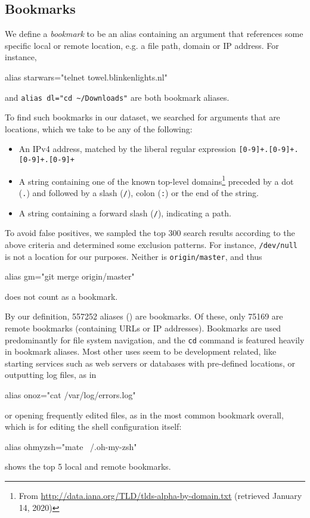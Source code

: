 \subsection{Bookmarks}

We define a \emph{bookmark} to be an alias containing an argument that references some specific local or remote location, e.g. a file path, domain or IP address.
For instance, 
\begin{CVerbatim}
alias starwars="telnet towel.blinkenlights.nl"    
\end{CVerbatim}
and \verb|alias dl="cd ~/Downloads"|
are both bookmark aliases.

To find such bookmarks in our dataset, we searched for arguments that are locations, which we take to be any of the following:
\begin{itemize}
    \item An IPv4 address, matched by the liberal regular expression \verb|[0-9]+.[0-9]+.[0-9]+.[0-9]+|
    \item A string containing one of the known top-level domains\footnote{From \url{http://data.iana.org/TLD/tlds-alpha-by-domain.txt} (retrieved January 14, 2020)} preceded by a dot (\verb|.|) and followed by a slash (\verb|/|), colon (\verb|:|) or the end of the string.
    \item A string containing a forward slash (\verb|/|), indicating a path.
\end{itemize}
To avoid false positives, we sampled the top 300 search results according to the above criteria and determined some exclusion patterns.
For instance, \texttt{/dev/null} is not a location for our purposes.
Neither is \texttt{origin/master}, and thus 
\begin{CVerbatim}
alias gm="git merge origin/master"
\end{CVerbatim}
does not count as a bookmark.

By our definition, \num{557252} aliases () are bookmarks.
Of these, only \num{75169} are remote bookmarks (containing URLs or IP addresses).
Bookmarks are used predominantly for file system navigation, and the \texttt{cd} command is featured heavily in bookmark aliases.
Most other uses seem to be development related, like starting services such as web servers or databases with pre-defined locations, or outputting log files, as in 
\begin{CVerbatim}
alias onoz="cat /var/log/errors.log"
\end{CVerbatim}
or opening frequently edited files, as in the most common bookmark overall, which is for editing the shell configuration itself:
\begin{CVerbatim}
alias ohmyzsh="mate ~/.oh-my-zsh"
\end{CVerbatim}
 shows the top 5 local and remote bookmarks.

